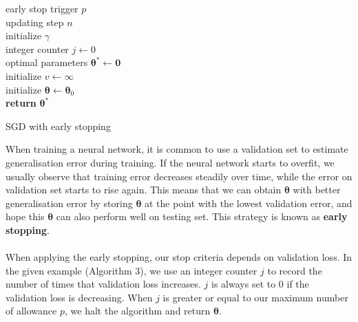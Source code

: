 \begin{algorithm}[H]
	early stop trigger $p$  \\
	updating step $n$\\
	initialize $\gamma$ \\
	integer counter $j \gets 0$\\
	optimal parameters $\mathbf{\theta}^{*} \gets \mathbf{0}$\\
	initialize $v \gets \infty$ \\
	initialize $\mathbf{\theta} \gets \mathbf{\theta}_{0}$ \\
		\textbf{return} $\mathbf{\theta}^{*}$
		\caption{SGD with early stopping}
	\end{algorithm}
\newpage
\noindent
When training a neural network, it is common to use a validation set to estimate generalisation error during training.
If the neural network starts to overfit, we usually observe that training error decreases steadily over time, while the error on validation set starts to rise again. 
This means that we can obtain $\mathbf{\theta}$ with better generalisation error by storing $\mathbf{\theta}$ at the point with the lowest validation error,
and hope this $\mathbf{\theta}$ can also perform well on testing set.
This strategy is known as \textbf{early stopping}.\\\\
When applying the early stopping, our stop criteria depends on validation loss.
In the given example (Algorithm 3), we use an integer counter $j$ to record the number of times that validation loss increases.
$j$ is always set to 0 if the validation loss is decreasing.
When $j$ is greater or equal to our maximum number of allowance $p$, we halt the algorithm and return $\mathbf{\theta}$\cite{Goodfellow2016Book}.


